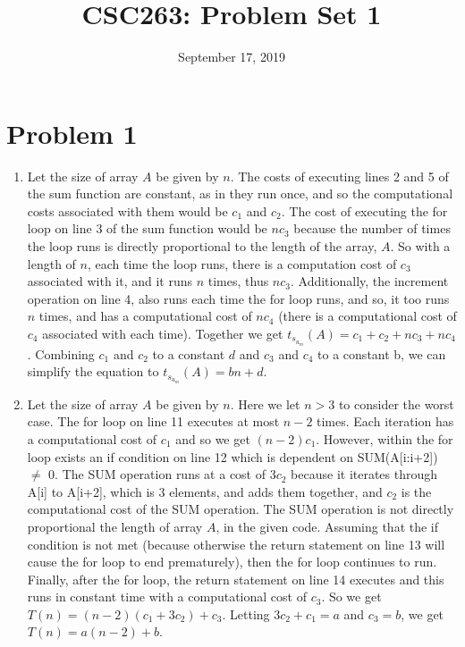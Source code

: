 \documentclass{article}
\title{CSC263: Problem Set 1}
\date{September 17, 2019}
\begin{document}
\maketitle

\section{Problem 1}
\begin{enumerate}[label=(\alph*)]
    \item Let the size of array $A$ be given by $n$. The costs of executing lines 2 and 5 of the sum function are constant, as in they run once, and so the computational costs associated with them would be $c_1$ and $c_2$. The cost of executing the for loop on line 3 of the sum function would be $nc_3$ because the number of times the loop runs is directly proportional to the length of the array, $A$. So with a length of $n$, each time the loop runs, there is a computation cost of $c_3$ associated with it, and it runs $n$ times, thus $nc_3$. Additionally, the increment operation on line 4, also runs each time the for loop runs, and so, it too runs $n$ times, and has a computational cost of $nc_4$ (there is a computational cost of $c_4$ associated with each time). Together we get $t_s_u_m(A) = c_1 + c_2 + nc_3 + nc_4$. Combining $c_1$ and $c_2$ to a constant $d$ and $c_3$ and $c_4$ to a constant b, we can simplify the equation to $t_s_u_m(A) = bn + d$.
    
    \item  Let the size of array $A$ be given by $n$. Here we let $n > 3$ to consider the worst case. The for loop on line 11 executes at most $n-2$ times. Each iteration has a computational cost of $c_1$ and so we get $(n-2)c_1$. However, within the for loop exists an if condition on line 12 which is dependent on SUM(A[i:i+2]) $\neq$ 0. The SUM operation runs at a cost of $3c_2$ because it iterates through A[i] to A[i+2], which is 3 elements, and adds them together, and $c_2$ is the computational cost of the SUM operation. The SUM operation is not directly proportional the length of array $A$, in the given code. Assuming that the if condition is not met (because otherwise the return statement on line 13 will cause the for loop to end prematurely), then the for loop continues to run. Finally, after the for loop, the return statement on line 14 executes and this runs in constant time with a computational cost of $c_3$. So we get $T(n) = (n-2)(c_1 + 3c_2) + c_3$. Letting $3c_2 + c_1 = a$ and $c_3 = b$, we get $T(n) = a(n-2) + b$. 
    

\end{enumerate}
\end{document}
